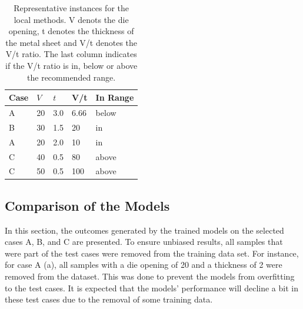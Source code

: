 \begin{table}[h]
    \begin{tcolorbox}[arc=0pt,boxrule=0.5pt]
        \centering
        \begin{tabular}{lllll}
            \toprule
            \textbf{Case} & \textbf{\(V\) } & \textbf{\(t\)} & \textbf{V/t} & \textbf{In Range} \\
            \toprule
            A             & 20              & 3.0            & 6.66         & below             \\
            \hdashline
            B             & 30              & 1.5            & 20           & in                \\
            A             & 20              & 2.0            & 10           & in                \\
            \hdashline
            C             & 40              & 0.5            & 80           & above             \\
            C             & 50              & 0.5            & 100          & above             \\
            \bottomrule
        \end{tabular}
    \end{tcolorbox}
    \caption{Representative instances for the local methods.
    V denots the die opening, t denotes the thickness of the metal sheet and V/t denotes the V/t ratio.
    The last column indicates if the V/t ratio is in, below or above the recommended range.}
    \label{tab:representative-instances}
\end{table}

\subsection{Comparison of the Models}\label{subsec:overall-comparison-model-performance}
In this section, the outcomes generated by the trained models on the selected cases A, B, and C are presented.
To ensure unbiased results, all samples that were part of the test cases were removed from the training data set.
For instance, for case A (a), all samples with a die opening of 20 and a thickness of 2 were removed from the dataset.
This was done to prevent the models from overfitting to the test cases.
It is expected that the models' performance will decline a bit in these test cases due to the removal of some
training data.

